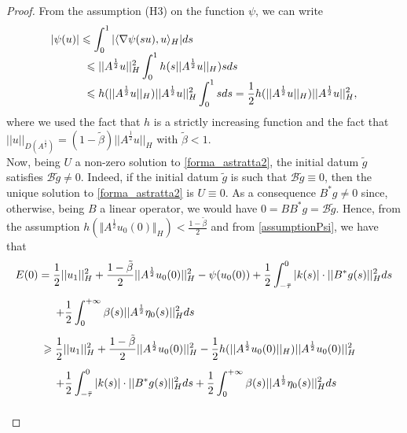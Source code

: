 \documentclass[11pt]{article}
\renewcommand{\geq}{\geqslant}
\renewcommand{\leq}{\leqslant}
\begin{document}
\begin{proof}
	From the assumption (H3) on the function $\psi$, we can write 
	\begin{equation}
		\label{assumptionPsi}
		\begin{array}{l}
			\displaystyle{|\psi(u)|\leq \int_0^1 |\langle \nabla \psi (su),u\rangle_H | ds} \\
			\hspace{1,15 cm}
			\displaystyle{\leq  ||A^\frac{1}{2}u||^2_H \int_0^1 h(s||A^\frac{1}{2}u||_H)sds}\\
			\hspace{1,15 cm}\displaystyle{\leq  h(||A^\frac{1}{2}u||_H)||A^\frac{1}{2}u||^2_H\int_{0}^{1}sds=\frac{1}{2}h(||A^\frac{1}{2}u||_H)||A^\frac{1}{2}u||^2_H,}
		\end{array}
	\end{equation}
where we used the fact that $h$ is a strictly increasing function and the fact that $||u||_{D(A^\frac{1}{2})}=(1-\tilde{\beta})||A^\frac{1}{2}u||_H$ with $\tilde{\beta}<1$.
\\Now, being $U$ a non-zero solution to \eqref{forma_astratta2}, the initial datum $\tilde{g}$ satisfies $\mathcal{B}\tilde{g}\neq 0$. Indeed, if the initial datum $\tilde{g}$ is such that $\mathcal{B}\tilde{g}\equiv 0$, then the unique solution to \eqref{forma_astratta2} is $U\equiv 0$. As a consequence $B^*g\neq 0$ since, otherwise, being $B$ a linear operator, we would have $0=BB^*g=\mathcal{B}\tilde{g}$. Hence, from the assumption $h (\Vert A^{\frac 12} u_0(0)\Vert_H) < \frac {1-\tilde \beta} 2$ and from \eqref{assumptionPsi}, we have that
	$$
	\begin{array}{l}
		\vspace{0.3cm}\displaystyle{ E(0)=\frac{1}{2}||u_1||_H^2+\frac{1-\tilde{\beta}}{2}||A^\frac{1}{2}u_0(0)||_H^2-\psi(u_0(0))+\frac{1}{2}\int_{-\bar\tau}^0 |k(s)|\cdot ||B^*g(s)||^2_H ds}\\
		\hspace{1.3 cm}
		\vspace{0.3cm}\displaystyle{+\frac{1}{2}\int_0^{+\infty} \beta(s)||A^\frac{1}{2}\eta_0(s)||_H^2 ds}\\
		\hspace{0,9 cm}
		\vspace{0.3cm}\displaystyle{\geq \frac{1}{2}||u_1||_H^2+\frac{1-\tilde{\beta}}{2}||A^\frac{1}{2}u_0(0)||_H^2-\frac{1}{2}h(||A^\frac{1}{2}u_0(0)||_H)||A^\frac{1}{2}u_0(0)||_H^2}\\
		\hspace{1.3 cm}
		\vspace{0.3cm}\displaystyle{+\frac{1}{2}\int_{-\bar\tau}^0 |k(s)|\cdot ||B^*g(s)||^2_H ds+\frac{1}{2}\int_0^{+\infty} \beta(s)||A^\frac{1}{2}\eta_0(s)||_H^2 ds}\\

\end{array}$$
\end{proof}
\end{document}

